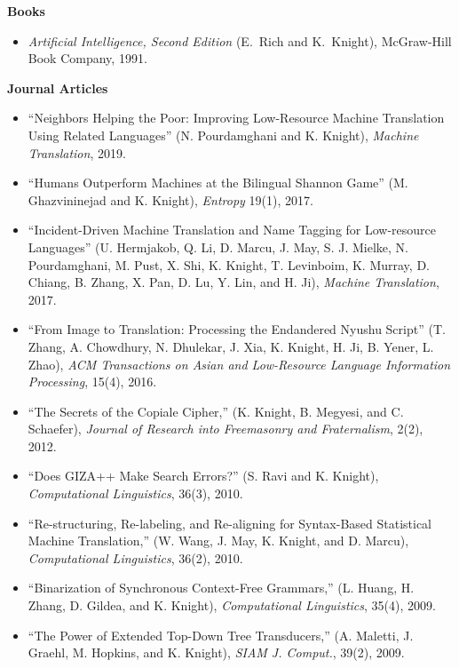 \noindent
{\bf Books}

\begin{itemize}
\item {\em Artificial Intelligence, Second Edition} (E.~Rich and K.~Knight),
McGraw-Hill Book Company, 1991.
\end{itemize}


\noindent
{\bf Journal Articles}
\begin{itemize}
\item ``Neighbors Helping the Poor: Improving Low-Resource Machine Translation Using Related Languages'' (N. Pourdamghani and K. Knight), {\em Machine Translation}, 2019. 

\item ``Humans Outperform Machines at the Bilingual Shannon Game'' (M. Ghazvininejad and K. Knight), {\em Entropy} 19(1), 2017.

\item ``Incident-Driven Machine Translation and Name Tagging for Low-resource Languages'' (U. Hermjakob, Q. Li, D. Marcu, J. May, S. J. Mielke, N. Pourdamghani, M. Pust, X. Shi, K. Knight, T. Levinboim, K. Murray, D. Chiang, B. Zhang, X. Pan, D. Lu, Y. Lin, and H. Ji), {\em Machine Translation}, 2017.

\item ``From Image to Translation: Processing the Endandered Nyushu Script'' (T. Zhang, A. Chowdhury, N. Dhulekar, J. Xia, K. Knight, H. Ji, B. Yener, L. Zhao), {\em ACM Transactions on Asian and Low-Resource Language Information Processing}, 15(4), 2016. 

\item ``The Secrets of the Copiale Cipher,'' 
(K. Knight, B. Megyesi, and C. Schaefer), 
{\em Journal of Research into Freemasonry and Fraternalism}, 2(2), 2012. 

\item ``Does GIZA++ Make Search Errors?'' (S. Ravi and K. Knight),
{\em Computational Linguistics}, 36(3), 2010.

\item ``Re-structuring, Re-labeling, and Re-aligning for Syntax-Based
Statistical Machine Translation,'' (W. Wang, J. May, K. Knight, 
and D. Marcu), {\em Computational Linguistics}, 36(2), 2010.

\item ``Binarization of Synchronous Context-Free Grammars,'' (L. Huang, 
H. Zhang, D. Gildea, and K. Knight), {\em Computational Linguistics}, 
35(4), 2009.

\item ``The Power of Extended Top-Down Tree Transducers,''
(A. Maletti, J. Graehl, M. Hopkins, and K. Knight),
{\em SIAM J. Comput.}, 39(2), 2009.


\end{itemize}
